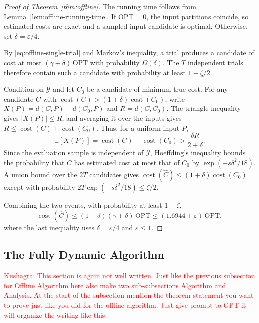 \documentclass[11pt]{article}
\theoremstyle{definition}
\theoremstyle{remark}
\newcommand{\1}{\mathbf{1}}
\newcommand{\kushagra}[1]{\textcolor{red}{\newline Kushagra: #1}}
\begin{document}
\begin{proof}[Proof of Theorem~\ref{thm:offline}]
The running time follows from Lemma~\ref{lem:offline-running-time}.
If $\mathrm{OPT}=0$, the input partitions coincide, so estimated
costs are exact and a sampled-input candidate is optimal.
Otherwise, set $\delta=\varepsilon/4$.

By \eqref{eq:offline-single-trial} and Markov's inequality,
a trial produces a candidate of cost at most
$(\gamma+\delta)\,\mathrm{OPT}$ with probability $\Omega(\delta)$.
The $T$ independent trials therefore contain such a candidate
with probability at least $1-\zeta/2$.

Condition on $\mathcal Y$ and let $C_0$ be a candidate of minimum
true cost. For any candidate $C$ with
$\operatorname{cost}(C)>(1+\delta)\operatorname{cost}(C_0)$,
write $X(P)=d(C,P)-d(C_0,P)$ and $R=d(C,C_0)$.
The triangle inequality gives $|X(P)|\leq R$, and averaging it
over the inputs gives $R\leq\operatorname{cost}(C)+
\operatorname{cost}(C_0)$. Thus, for a uniform input $P$,
\[
    \mathbb E[X(P)]
        =\operatorname{cost}(C)-\operatorname{cost}(C_0)
        >\frac{\delta R}{2+\delta}.
\]
Since the evaluation sample is independent of $\mathcal Y$,
Hoeffding's inequality bounds the probability that $C$ has
estimated cost at most that of $C_0$ by $\exp(-s\delta^2/18)$.
A union bound over the $2T$ candidates gives
$\operatorname{cost}(\widehat C)\leq
(1+\delta)\operatorname{cost}(C_0)$ except with probability
$2T\exp(-s\delta^2/18)\leq\zeta/2$.

Combining the two events, with probability at least $1-\zeta$,
\[
    \operatorname{cost}(\widehat C)
    \leq (1+\delta)(\gamma+\delta)\,\mathrm{OPT}
    \leq (1.6944+\varepsilon)\,\mathrm{OPT},
\]
where the last inequality uses $\delta=\varepsilon/4$ and
$\varepsilon\leq1$.
\end{proof}

\subsection{The Fully Dynamic Algorithm}
\label{subsec:dynamic-algorithm}

\kushagra{This section is again not well written. Just like the previous subsection for Offline Algorithm here also make two sub-subsections Algorithm and Analysis.  At the start of the subsection mention the theorem statement you want to prove just like you did for the offline algorithm. Just give prompt to GPT it will organize the writing like this.}
\end{document}
